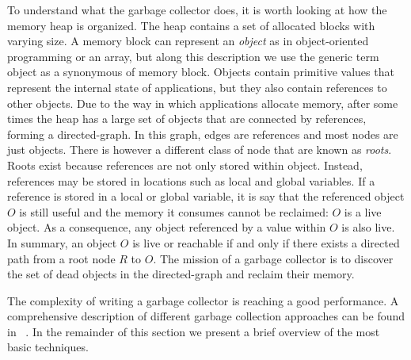 To understand what the garbage collector does, it is worth looking at how the memory heap is organized.
The heap contains a set of allocated blocks with varying size.
A memory block can represent an \textit{object} as in object-oriented programming or an array, but along this description we use the generic term object as a synonymous of memory block. 
Objects contain primitive values that represent the internal state of applications, but they also contain references to other objects.
Due to the way in which applications allocate memory, after some times the heap has a large set of objects that are connected by references, forming a directed-graph.
In this graph, edges are references and most nodes are just objects.
There is however a different class of node that are known as \textit{roots}.
Roots exist because references are not only stored within object.
Instead, references may be stored in locations such as local and global variables.
If a reference is stored in a local or global variable, it is say that the referenced object $O$ is still useful and the memory it consumes cannot be reclaimed: $O$ is a live object.
As a consequence, any object referenced by a value within $O$ is also live.
In summary, an object $O$ is live or reachable if and only if there exists a directed path from a root node $R$ to $O$.
The mission of a garbage collector is to discover the set of dead objects in the directed-graph and reclaim their memory.

The complexity of writing a garbage collector is reaching a good performance.
A comprehensive description of different garbage collection approaches can be found in ~\cite{Richard2012}.
In the remainder of this section we present a brief overview of the most basic techniques.

